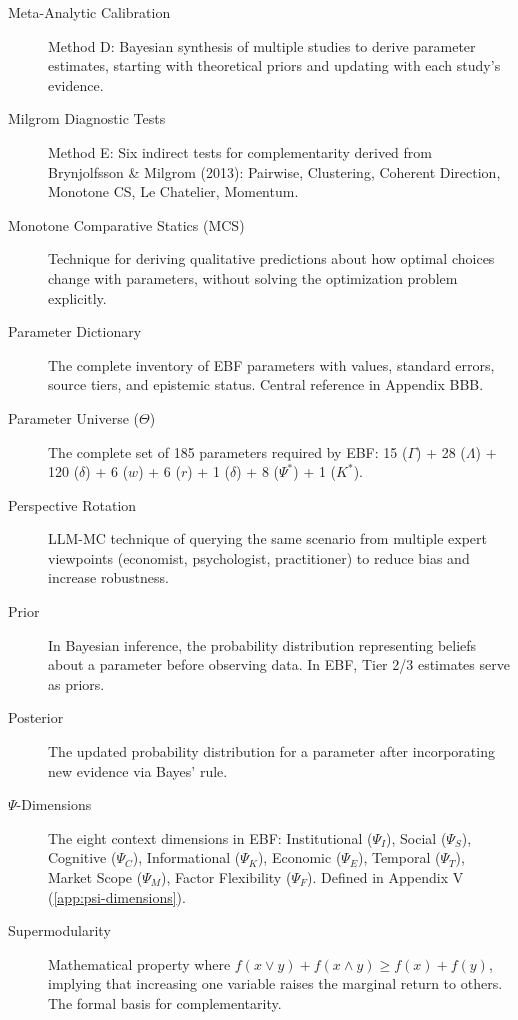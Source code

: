 \documentclass[11pt,a4paper]{article}
\theoremstyle{definition}
\begin{document}
\begin{description}
\item[Meta-Analytic Calibration]
Method D: Bayesian synthesis of multiple studies to derive parameter estimates, 
starting with theoretical priors and updating with each study's evidence.

\item[Milgrom Diagnostic Tests]
Method E: Six indirect tests for complementarity derived from 
Brynjolfsson \& Milgrom (2013): Pairwise, Clustering, Coherent Direction, 
Monotone CS, Le Chatelier, Momentum.

\item[Monotone Comparative Statics (MCS)]
Technique for deriving qualitative predictions about how optimal choices 
change with parameters, without solving the optimization problem explicitly.

\item[Parameter Dictionary]
The complete inventory of EBF parameters with values, standard errors, 
source tiers, and epistemic status. Central reference in Appendix BBB.

\item[Parameter Universe ($\Theta$)]
The complete set of 185 parameters required by EBF: 15 ($\Gamma$) + 28 ($\Lambda$) 
+ 120 ($\delta$) + 6 ($w$) + 6 ($r$) + 1 ($\delta$) + 8 ($\Psi^*$) + 1 ($K^*$).

\item[Perspective Rotation]
LLM-MC technique of querying the same scenario from multiple expert viewpoints 
(economist, psychologist, practitioner) to reduce bias and increase robustness.

\item[Prior]
In Bayesian inference, the probability distribution representing beliefs about 
a parameter before observing data. In EBF, Tier 2/3 estimates serve as priors.

\item[Posterior]
The updated probability distribution for a parameter after incorporating new 
evidence via Bayes' rule.

\item[$\Psi$-Dimensions]
The eight context dimensions in EBF: Institutional ($\Psi_I$), Social ($\Psi_S$), 
Cognitive ($\Psi_C$), Informational ($\Psi_K$), Economic ($\Psi_E$), Temporal ($\Psi_T$), 
Market Scope ($\Psi_M$), Factor Flexibility ($\Psi_F$). Defined in Appendix V (\ref{app:psi-dimensions}).

\item[Supermodularity]
Mathematical property where $f(x \vee y) + f(x \wedge y) \geq f(x) + f(y)$, 
implying that increasing one variable raises the marginal return to others. 
The formal basis for complementarity.


\end{description}
\end{document}
